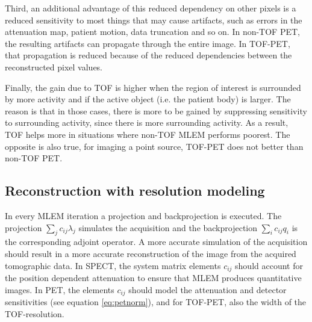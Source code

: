 \documentclass[11pt,oneside]{article}
\begin{document}
Third, an additional advantage of this reduced dependency on other
pixels is a reduced sensitivity to most things that may cause
artifacts, such as errors in the attenuation map, patient motion, data
truncation and so on. In non-TOF PET, the resulting artifacts can
propagate through the entire image. In TOF-PET, that propagation is
reduced because of the reduced dependencies between the reconstructed
pixel values.

Finally, the gain due to TOF is higher when the region of interest is
surrounded by more activity and if the active object (i.e. the patient
body) is larger. The reason is that in those cases, there is more to
be gained by suppressing sensitivity to surrounding activity, since
there is more surrounding activity. As a result, TOF helps more in
situations where non-TOF MLEM performs poorest. The opposite is also
true, for imaging a point source, TOF-PET does not better than non-TOF
PET.

\subsection{Reconstruction with resolution modeling} \label{sec:resol}
In every MLEM iteration a projection and backprojection is
executed. The projection $\sum_j c_{ij} \lambda_j$ simulates the
acquisition and the backprojection $\sum_i c_{ij} q_i$ is the
corresponding adjoint operator. A more accurate simulation of the
acquisition should result in a more accurate reconstruction of the
image from the acquired tomographic data. In SPECT, the system matrix
elements $c_{ij}$ should account for the position dependent
attenuation to ensure that MLEM produces quantitative images. In PET,
the elements $c_{ij}$ should model the attenuation and detector
sensitivities (see equation \ref{eq:petnorm}), and for TOF-PET, also
the width of the TOF-resolution.
\end{document}

